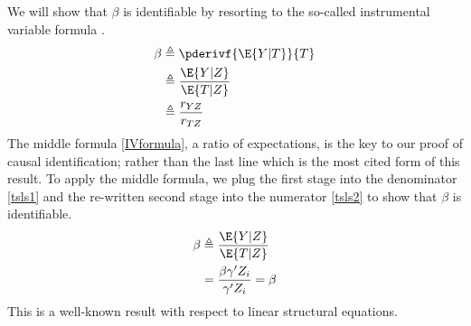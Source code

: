 We will show that $\beta$ is identifiable by resorting to the
so-called instrumental variable formula \citep{BowdTurk90}.
\begin{align}\label{IVformula}
\beta & \triangleq \pderivf{ \E{Y|T} }{T} \nonumber \\
& \triangleq \frac{\E{Y|Z}}{\E{T|Z}} \\
& \triangleq \frac{r_{YZ}}{r_{TZ}} \nonumber 
\end{align}
The middle formula \eqref{IVformula}, a ratio of expectations, is the
key to our proof of causal identification; rather than the last line
which is the most cited form of this result.
To apply the middle formula, we plug the first stage into
the denominator \eqref{tsls1} and the re-written second stage into the
numerator \eqref{tsls2} to show that $\beta$ is identifiable.
\begin{align*}
\beta & \triangleq \frac{\E{Y|Z}}{\E{T|Z}} \\
& = \frac{\beta \gamma' Z_i }{\gamma' Z_i } = \beta
\end{align*}
This is a well-known result with respect to linear structural equations.

